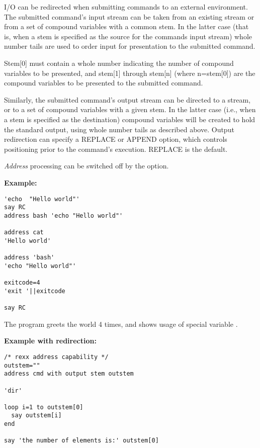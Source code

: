 I/O can be redirected when submitting commands to an external
environment. The submitted command's input stream can be taken from an
existing stream or from a set of compound variables with a common
stem. In the latter case (that is, when a stem is specified as the
source for the commands input stream) whole number tails are used to
order input for presentation to the submitted command.

Stem[0] must contain a whole number indicating the number of compound variables to be presented, and stem[1] through stem[n] (where n=stem[0]) are the compound variables to be presented to the submitted command.

Similarly, the submitted command's output stream can be directed to a stream, or to a set of compound variables with a given stem. In the latter case (i.e., when a stem is specified as the destination) compound variables will be created to hold the standard output, using whole number tails as described above. Output redirection can specify a REPLACE or APPEND option, which controls positioning prior to the command's execution. REPLACE is the default.

\emph{Address} processing can be switched off by the  option.

\textbf{Example:}
\begin{lstlisting}
'echo  "Hello world"'
say RC
address bash 'echo "Hello world"'

address cat
'Hello world'

address 'bash'
'echo "Hello world"'

exitcode=4
'exit '||exitcode
 
say RC
\end{lstlisting}
The program greets the world 4 times, and shows usage of special variable .

\textbf{Example with redirection:}
\begin{lstlisting}
/* rexx address capability */
outstem=""
address cmd with output stem outstem

'dir'

loop i=1 to outstem[0]
  say outstem[i]
end

say 'the number of elements is:' outstem[0]
\end{lstlisting}